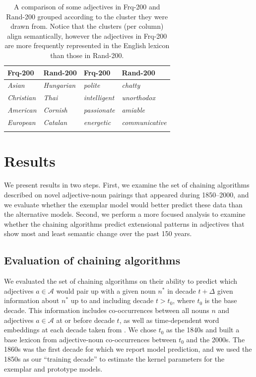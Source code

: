 \documentclass[output=paper]{langsci/langscibook}
\begin{document}
\begin{table}
\caption{A comparison of some adjectives in {\sc Frq-200} and {\sc Rand-200} grouped according to the cluster they were drawn from.
Notice that the clusters (per column) align semantically, however the adjectives in {\sc Frq-200} are more frequently represented in the English lexicon than those in {\sc Rand-200}.}
\label{table:clusters} 
\begin{tabular}{llll}
\lsptoprule
{\sc Frq-200} & {\sc Rand-200} & {\sc Frq-200} & {\sc Rand-200} \\
\midrule
{\it Asian} & {\it Hungarian} & {\it polite} & {\it chatty} \\
{\it Christian} & {\it Thai} & {\it intelligent} & {\it unorthodox} \\
{\it American} & {\it Cornish} & {\it passionate} & {\it amiable} \\
{\it European} & {\it Catalan} & {\it energetic} & {\it communicative} \\
\lspbottomrule
\end{tabular}
\end{table}




\section{Results}

We present results in two steps. First, we examine the set of chaining algorithms described on novel adjective-noun pairings that appeared during 1850--2000, and we evaluate whether the exemplar model would better predict these data than the alternative models. Second, we perform a more focused analysis to examine whether the chaining algorithms predict extensional patterns in adjectives that show most and least semantic change over the past 150 years.

\subsection{Evaluation of chaining algorithms} \label{sec:modeval}

We evaluated the set of chaining algorithms on their ability to predict which adjectives $a \in \mathcal{A}$ would pair up with a given noun $n^*$ in decade $t + \Delta$ given  information about $n^*$ up to and including decade $t > t_0$, where $t_0$ is the base decade.
This information includes co-occurrences between all nouns $n$ and adjectives $a \in \mathcal{A}$ at or before decade $t$, as well as time-dependent word embeddings at each decade taken from \citet{hamilton-etal-2016-diachronic}.
We chose $t_0$ as the 1840s and built a base lexicon from adjective-noun co-occurrences between $t_0$ and the 2000s.
The 1860s was the first decade for which we report model prediction, and we used the 1850s as our ``training decade'' to estimate the kernel parameters for the exemplar and prototype models.
\end{document}
